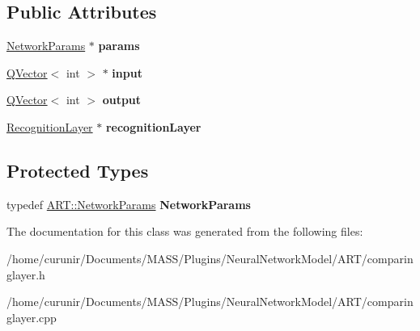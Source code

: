 \subsection*{Public Attributes}
\begin{DoxyCompactItemize}
\item 
\hyperlink{struct_a_r_t_1_1_network_params}{Network\+Params} $\ast$ {\bfseries params}\hypertarget{class_comparing_layer_a2c69b1c07b6cdf6ff5230680776bcb71}{}\label{class_comparing_layer_a2c69b1c07b6cdf6ff5230680776bcb71}

\item 
\hyperlink{class_q_vector}{Q\+Vector}$<$ int $>$ $\ast$ {\bfseries input}\hypertarget{class_comparing_layer_ac530a1f5b25253d54cc6ee7331d6cc4f}{}\label{class_comparing_layer_ac530a1f5b25253d54cc6ee7331d6cc4f}

\item 
\hyperlink{class_q_vector}{Q\+Vector}$<$ int $>$ {\bfseries output}\hypertarget{class_comparing_layer_af224db952c3b4562e4f9e758369a53f8}{}\label{class_comparing_layer_af224db952c3b4562e4f9e758369a53f8}

\item 
\hyperlink{class_recognition_layer}{Recognition\+Layer} $\ast$ {\bfseries recognition\+Layer}\hypertarget{class_comparing_layer_a76b454e89f511095e167fd7352595e9b}{}\label{class_comparing_layer_a76b454e89f511095e167fd7352595e9b}

\end{DoxyCompactItemize}
\subsection*{Protected Types}
\begin{DoxyCompactItemize}
\item 
typedef \hyperlink{struct_a_r_t_1_1_network_params}{A\+R\+T\+::\+Network\+Params} {\bfseries Network\+Params}\hypertarget{class_comparing_layer_af0bbef51f4b8cc8693626693a25b3b3f}{}\label{class_comparing_layer_af0bbef51f4b8cc8693626693a25b3b3f}

\end{DoxyCompactItemize}


The documentation for this class was generated from the following files\+:\begin{DoxyCompactItemize}
\item 
/home/curunir/\+Documents/\+M\+A\+S\+S/\+Plugins/\+Neural\+Network\+Model/\+A\+R\+T/comparinglayer.\+h\item 
/home/curunir/\+Documents/\+M\+A\+S\+S/\+Plugins/\+Neural\+Network\+Model/\+A\+R\+T/comparinglayer.\+cpp\end{DoxyCompactItemize}
